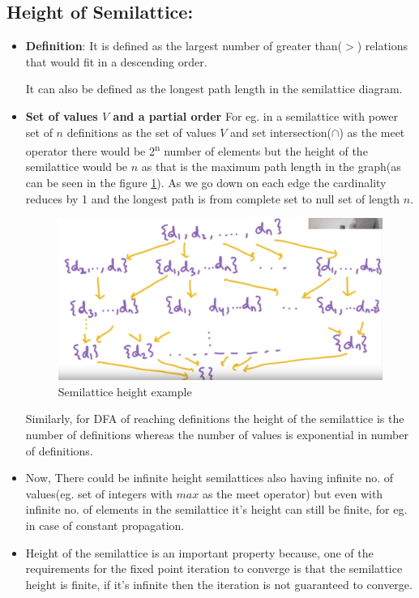 \subsection{Height of Semilattice:}
\begin{itemize}
    \item \textbf{Definition}: It is defined as the largest number of greater than($>$) relations that would fit in a descending order.
    \par It can also be defined as the longest path length in the semilattice diagram.
    \item \textbf{Set of values $V$ and a partial order} For eg. in a semilattice with power set of $n$ definitions as the set of values $V$ and set intersection($\cap$) as the meet operator there would be 2\textsuperscript{n} number of elements but the height of the semilattice would be $n$ as that is the maximum path length in the graph(as can be seen in the figure \ref{fig:height_semilattice}). As we go down on each edge the cardinality reduces by 1 and the longest path is from complete set to null set of length $n$.
    \begin{figure}
    \centering
    \includegraphics[width=1\linewidth]{images/semilattice_height.png}
    \caption{Semilattice height example}
    \label{fig:height_semilattice}
    \end{figure}
    \par Similarly, for DFA of reaching definitions the height of the semilattice is the number of definitions whereas the number of values is exponential in number of definitions.
    \item Now, There could be infinite height semilattices also having infinite no. of values(eg. set of integers with $max$ as the meet operator) but even with infinite no. of elements in the semilattice it’s height can still be finite, for eg. in case of constant propagation.
    \item Height of the semilattice is an important property because, one of the requirements for the fixed point iteration to converge is that the semilattice height is finite, if it’s infinite then the iteration is not guaranteed to converge.
\end{itemize}
